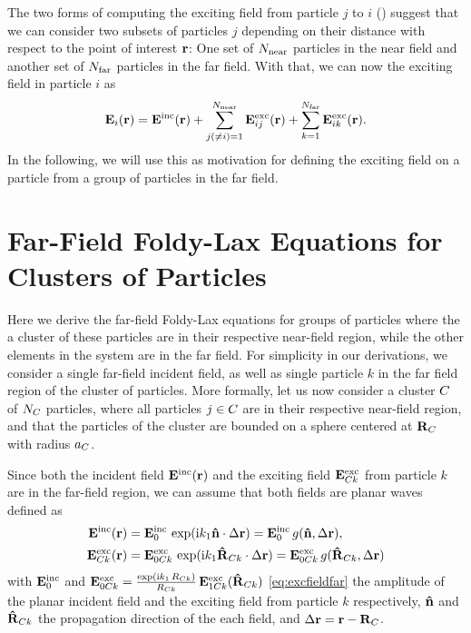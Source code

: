 The two forms of computing the exciting field from particle $j$ to $i$ () suggest that we can consider two subsets of particles $j$ depending on their distance with respect to the point of interest $\mathbf{r}$: One set of ${N_{\text{near}}}$ particles in the near field and another set of ${N_{\text{far}}}$ particles in the far field. With that, we can now the exciting field in particle $i$ as
%
\begin{align}
\mathbf{E}_i(\mathbf{r})= \mathbf{E}^\text{inc}(\mathbf{r}) + \sum_{j(\neq i)=1}^{N_{\text{near}}} \mathbf{E}^\text{exc}_{ij}(\mathbf{r}) + \sum_{k=1}^{N_{\text{far}}} \mathbf{E}^\text{exc}_{ik}(\mathbf{r}).
\label{eq:foldylaxtwo}
\end{align}
%
%
In the following, we will use this as motivation for defining the exciting field on a particle from a group of particles in the far field. 


\section{Far-Field Foldy-Lax Equations for Clusters of Particles}
\label{sec:farfield_foldy_clusters}
Here we derive the far-field Foldy-Lax equations for groups of particles where the a cluster of these particles are in their respective near-field region, while the other elements in the system are in the far field. For simplicity in our derivations, we consider a single far-field incident field, as well as single particle $k$ in the far field region of the cluster of particles. 
%
More formally, let us now consider a cluster $C$ of $N_C$ particles, where all particles $j\in C$ are in their respective near-field region, and that the particles of the cluster are bounded on a sphere centered at $\mathbf{R}_C$ with radius $a_C$. 

Since both the incident field $\mathbf{E}^\text{inc}(\mathbf{r})$ and the exciting field $\mathbf{E}^\text{exc}_{C k}$ from particle $k$ are in the far-field region, we can assume that both fields are planar waves defined as
\begin{align}
    \label{eq:farincfieldcluster}
    \mathbf{E}^\text{inc}(\mathbf{r}) &= \mathbf{E}^\text{inc}_0 \,\exp(\text{i} k_1 \mathbf{\hat{n}} \cdot \Delta \mathbf{r}) = \mathbf{E}^\text{inc}_0\,g(\mathbf{\hat{n}}, \Delta \mathbf{r}) , \\
    \mathbf{E}^\text{exc}_{C k}(\mathbf{r}) &= \mathbf{E}^\text{exc}_{0C k}\,\exp(\text{i} k_1 \mathbf{\hat{R}}_{C k} \cdot \Delta \mathbf{r}) =  \mathbf{E}^\text{exc}_{0C k}\,g(\mathbf{\hat{R}}_{C k}, \Delta \mathbf{r}) 
    \label{eq:farexcfieldcluster} 
\end{align}
%
with $\mathbf{E}^\text{inc}_0$ and $\mathbf{E}^\text{exc}_{0C k}=\frac{\exp(\text{i} k_1 \,R_{C k})}{R_{C k}}\,\mathbf{E}^\text{exc}_{1C k}(\mathbf{\hat{R}}_{C k})$  \eqref{eq:excfieldfar} the amplitude of the planar incident field and the exciting field from particle $k$ respectively, $\mathbf{\hat{n}}$ and $\mathbf{\hat{R}}_{C k}$ the propagation direction of the each field, and $\Delta \mathbf{r}=\mathbf{r}-\mathbf{R}_C$.
%

